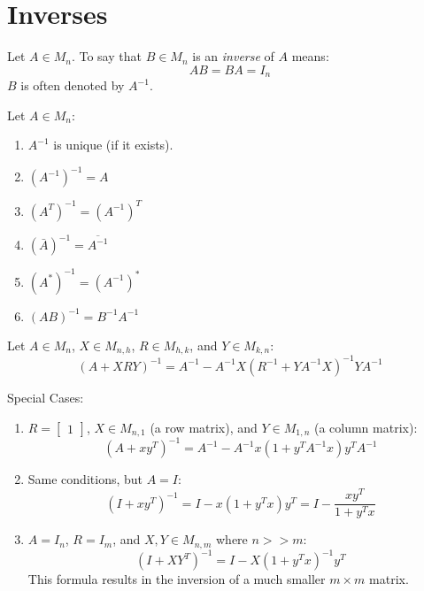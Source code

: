 \documentclass[letterpaper,12pt,fleqn]{article}
\begin{document}
\section*{Inverses}

\begin{definition}[Inverses]
  Let $A\in M_n$. To say that $B\in M_n$ is an \emph{inverse} of $A$ means:
  \[AB=BA=I_n\]
  $B$ is often denoted by $A^{-1}$.
\end{definition}

\begin{properties}
  Let $A\in M_n$:
  \begin{enumerate}
  \item $A^{-1}$ is unique (if it exists).
  \item $(A^{-1})^{-1}=A$
  \item $(A^T)^{-1}=(A^{-1})^T$
  \item $(\bar{A})^{-1}=\overline{A^{-1}}$
  \item $(A^*)^{-1}=(A^{-1})^*$
  \item $(AB)^{-1}=B^{-1}A^{-1}$
  \end{enumerate}
\end{properties}

\begin{theorem}
  Let $A\in M_n$, $X\in M_{n,h}$, $R\in M_{h,k}$, and $Y\in M_{k,n}$:
  \[(A+XRY)^{-1}=A^{-1}-A^{-1}X(R^{-1}+YA^{-1}X)^{-1}YA^{-1}\]
\end{theorem}

Special Cases:
\begin{enumerate}
\item $R=\begin{bmatrix} 1 \end{bmatrix}$, $X\in M_{n,1}$ (a row matrix), and
  $Y\in M_{1,n}$ (a column matrix):
  \[(A+xy^T)^{-1}=A^{-1}-A^{-1}x(1+y^TA^{-1}x)y^TA^{-1}\]

\item Same conditions, but $A=I$:
  \[(I+xy^T)^{-1}=I-x(1+y^Tx)y^T=I-\frac{xy^T}{1+y^Tx}\]

\item $A=I_n$, $R=I_m$, and $X,Y\in M_{n,m}$ where $n>>m$:
  \[(I+XY^T)^{-1}=I-X(1+y^Tx)^{-1}y^T\]
  This formula results in the inversion of a much smaller $m\times m$ matrix.
\end{enumerate}
\end{document}
